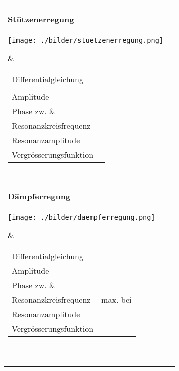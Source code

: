 \renewcommand{\arraystretch}{1.3}
\begin{tabular}{|l|l|}
\hline
\parbox{6cm}{
	\textbf{Stützenerregung}\\ \\
	\texttt{[image: ./bilder/stuetzenerregung.png]}}
	& \begin{minipage}[]{12cm}
      \renewcommand{\arraystretch}{2}
		\begin{tabular}{ll}
    	Differentialgleichung
    		& $m\,\ddot{y}+b\,\dot{y}+c\,y=$
    		\textcolor{blue}{$c\,u_0\,\sin(\omega t) + b\,\omega\,u_0\,\cos(\omega t)$}
    		\\ & $m\, \ddot{q} + b\,\dot{q} + c\,q =$
    		\textcolor{blue}{$m\,\omega^2\,u_0\,\sin(\omega t)$} \\
    	Amplitude
    		&
    		$A=\dfrac{\omega^2\,u_0}{\sqrt{(\omega_0^2-\omega^2)^2+(2D\,\omega_0\,\omega)^2}}$ \\
    	Phase zw. $\omega_0$ \& $\omega$
    		&
    		$\varphi=\arctan\left(\dfrac{2D\,\omega_0\,\omega}{\omega_0^2-\omega^2}\right)-\pi$\\ 
    	Resonanzkreisfrequenz
    		& $\omega_r=\dfrac{\omega_0}{\sqrt{1-2D^2}}$\\
    	Resonanzamplitude
    		& $A_r=\dfrac{u_0}{2D\sqrt{1-D^2}}$\\
    	Vergrösserungsfunktion
    		& $V=\dfrac{\eta^2}{\sqrt{(1-\eta^2)^2+(2D\eta)^2}}$ 
		\end{tabular}
    \end{minipage} \\
\hline
\parbox{6cm}{
	\textbf{Dämpferregung}\\ \\
	\texttt{[image: ./bilder/daempferregung.png]}}
	& \begin{minipage}[]{12cm}
      \renewcommand{\arraystretch}{2}
		\begin{tabular}{ll}
    	Differentialgleichung
    		& $m\,\ddot{y}+b\,\dot{y}+c\,y=$
    		\textcolor{blue}{$b\,\omega\,u_0\,\sin(\omega t+\frac{\pi}{2})$} \\
    	Amplitude
    		&
    		$A=\dfrac{b\,\omega\,u_0}{m\sqrt{(\omega_0^2-\omega^2)^2+(2D\,\omega_0\,\omega)^2}}$ \\
    	Phase zw. $\omega_0$ \& $\omega$
    		&
    		$\varphi=\operatorname{arctan}\left(\dfrac{2D\,\omega_0\,\omega}{\omega_0^2-\omega^2}\right)-\dfrac{\pi}{2}$\\ 
    	Resonanzkreisfrequenz
    		& $\omega_r=\omega_0 \quad \rightarrow$\quad max. bei $\eta=1$\\
    	Resonanzamplitude
    		& $A_r=u_0\quad\rightarrow\quad V(1)=1$\\
    	Vergrösserungsfunktion
    		&
    		$V=\dfrac{2 \,D\, \eta}{\sqrt{(1-\eta^2)^2+(2D\eta)^2}}$ 
		\end{tabular}
    \end{minipage} \\
\hline
\end{tabular}
